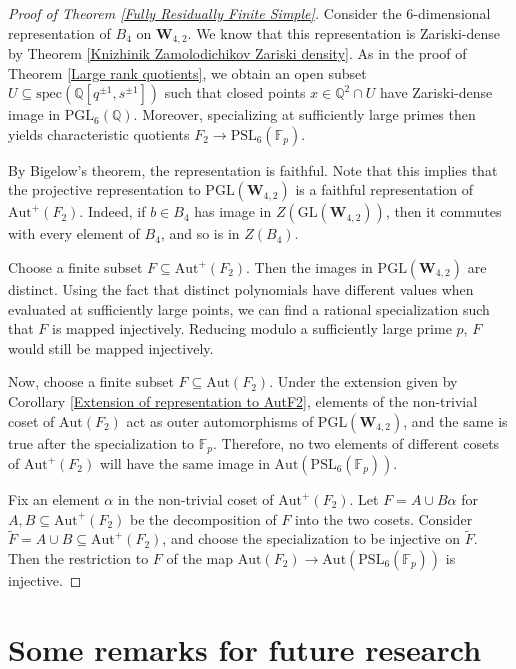 \documentclass[letterpaper]{amsart}
\begin{document}
\begin{proof}[Proof of Theorem \ref{Fully Residually Finite Simple}]
Consider the $6$-dimensional representation of $B_4$ on $\textbf{W}_{4, 2}$. We know that this representation is Zariski-dense by Theorem \ref{Knizhinik Zamolodichikov Zariski density}. As in the proof of Theorem \ref{Large rank quotients}, we obtain an open subset $U \subseteq \mathrm{spec}(\mathbb{Q}[q^{\pm 1}, s^{\pm 1}])$ such that closed points $x \in \mathbb{Q}^2 \cap U$ have Zariski-dense image in $\mathrm{PGL}_6(\mathbb{Q})$. Moreover, specializing at sufficiently large primes then yields characteristic quotients $F_2 \to \mathrm{PSL}_6(\mathbb{F}_p).$

By Bigelow's theorem, the representation is faithful. Note that this implies that the projective representation to $\mathrm{PGL}(\textbf{W}_{4,2})$ is a faithful representation of $\mathrm{Aut}^+(F_2)$. Indeed, if $b \in B_4$ has image in $Z(\mathrm{GL}(\textbf{W}_{4,2}))$, then it commutes with every element of $B_4$, and so is in $Z(B_4)$.

Choose a finite subset $F \subseteq \mathrm{Aut}^+(F_2)$. Then the images in $\mathrm{PGL}(\textbf{W}_{4,2})$ are distinct. Using the fact that distinct polynomials have different values when evaluated at sufficiently large points, we can find a rational specialization such that $F$ is mapped injectively. Reducing modulo a sufficiently large prime $p$, $F$ would still be mapped injectively.

Now, choose a finite subset $F \subseteq \mathrm{Aut}(F_2)$. Under the extension given by Corollary \ref{Extension of representation to AutF2}, elements of the non-trivial coset of $\mathrm{Aut}(F_2)$ act as outer automorphisms of $\mathrm{PGL}(\textbf{W}_{4,2})$, and the same is true after the specialization to $\mathbb{F}_p$. Therefore, no two elements of different cosets of $\mathrm{Aut}^+(F_2)$ will have the same image in $\mathrm{Aut}(\mathrm{PSL}_6(\mathbb{F}_p))$.

Fix an element $\alpha$ in the non-trivial coset of $\mathrm{Aut}^+(F_2)$. Let $F = A \cup B \alpha$ for $A, B \subseteq \mathrm{Aut}^+(F_2)$ be the decomposition of $F$ into the two cosets. Consider $\tilde{F} = A \cup B \subseteq \mathrm{Aut}^+(F_2)$, and choose the specialization to be injective on $\tilde{F}$. Then the restriction to $F$ of the map $\mathrm{Aut}(F_2) \to \mathrm{Aut}(\mathrm{PSL}_6(\mathbb{F}_p))$ is injective.
\end{proof}
\section{Some remarks for future research}
\end{document}
